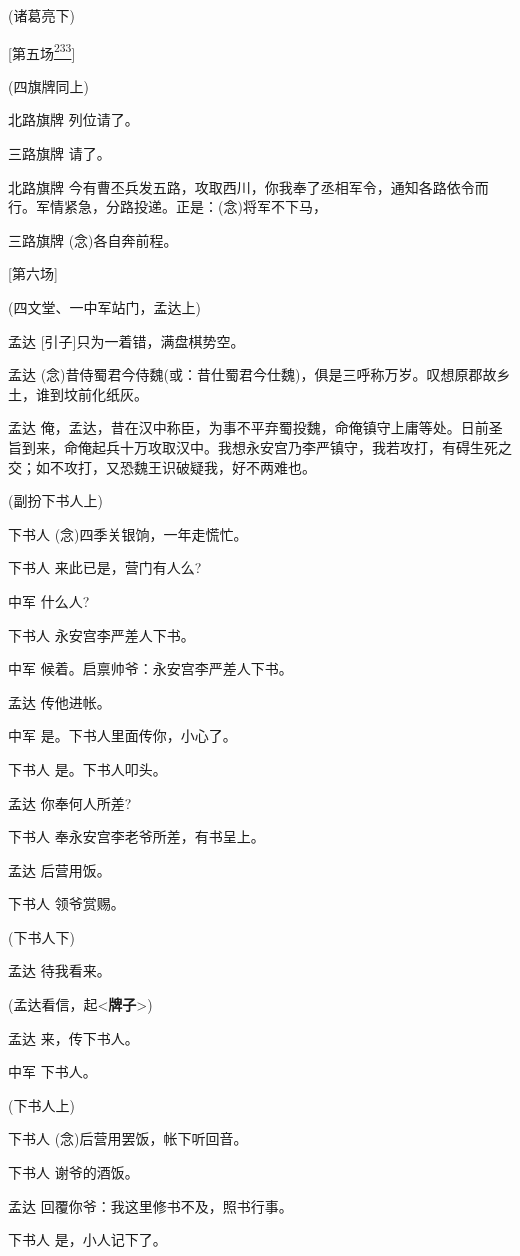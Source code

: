 (诸葛亮下)

{[}第五场\protect\hyperlink{fn233}{\textsuperscript{233}}{]}

(四旗牌同上)

北路旗牌 列位请了。

三路旗牌 请了。

北路旗牌
今有曹丕兵发五路，攻取西川，你我奉了丞相军令，通知各路依令而行。军情紧急，分路投递。正是：(念)将军不下马，

三路旗牌 (念)各自奔前程。

{[}第六场{]}

(四文堂、一中军站门，孟达上)

孟达 {[}引子{]}只为一着错，满盘棋势空。

孟达
(念)昔侍蜀君今侍魏(或：昔仕蜀君今仕魏)，俱是三呼称万岁。叹想原郡故乡土，谁到坟前化纸灰。

孟达
俺，孟达，昔在汉中称臣，为事不平弃蜀投魏，命俺镇守上庸等处。日前圣旨到来，命俺起兵十万攻取汉中。我想永安宫乃李严镇守，我若攻打，有碍生死之交；如不攻打，又恐魏王识破疑我，好不两难也。

(副扮下书人上)

下书人 (念)四季关银饷，一年走慌忙。

下书人 来此已是，营门有人么?

中军 什么人?

下书人 永安宫李严差人下书。

中军 候着。启禀帅爷：永安宫李严差人下书。

孟达 传他进帐。

中军 是。下书人里面传你，小心了。

下书人 是。下书人叩头。

孟达 你奉何人所差?

下书人 奉永安宫李老爷所差，有书呈上。

孟达 后营用饭。

下书人 领爷赏赐。

(下书人下)

孟达 待我看来。

(孟达看信，起\textless{}\textbf{牌子}\textgreater{})

孟达 来，传下书人。

中军 下书人。

(下书人上)

下书人 (念)后营用罢饭，帐下听回音。

下书人 谢爷的酒饭。

孟达 回覆你爷：我这里修书不及，照书行事。

下书人 是，小人记下了。

